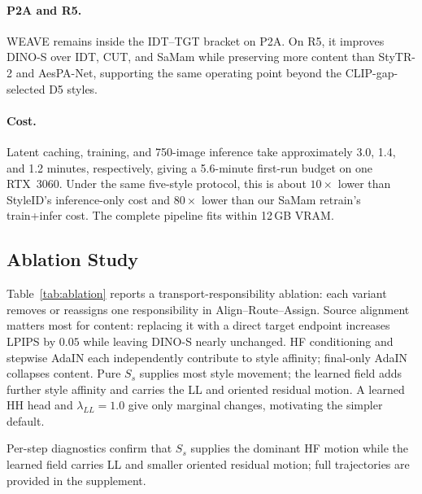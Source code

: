 \documentclass[letterpaper]{article} %
\begin{document}
\paragraph{P2A and R5.}
WEAVE remains inside the IDT--TGT bracket on P2A. On R5, it improves
DINO-S over IDT, CUT, and SaMam while preserving more content than
StyTR-2 and AesPA-Net, supporting the same operating point beyond the
CLIP-gap-selected D5 styles.

\paragraph{Cost.}
Latent caching, training, and 750-image inference take approximately
3.0, 1.4, and 1.2 minutes, respectively, giving a 5.6-minute first-run
budget on one RTX~3060. Under the same five-style protocol, this is
about $10\times$ lower than StyleID's inference-only cost and
$80\times$ lower than our SaMam retrain's train+infer cost. The complete
pipeline fits within 12\,GB VRAM.

\subsection{Ablation Study}
\label{sec:ablation}

Table~\ref{tab:ablation} reports a transport-responsibility ablation: each variant removes
or reassigns one responsibility in Align--Route--Assign. Source alignment matters most for
content: replacing it with a direct target endpoint increases LPIPS by $0.05$ while leaving
DINO-S nearly unchanged. HF conditioning and stepwise AdaIN each independently contribute
to style affinity; final-only AdaIN collapses content. Pure $S_s$ supplies most style movement; the learned field adds
further style affinity and carries the LL and oriented residual motion. A learned HH head and $\lambda_{LL}{=}1.0$ give only
marginal changes, motivating the simpler default.

Per-step diagnostics confirm that $S_s$ supplies the dominant HF motion while the learned field carries LL and smaller oriented residual motion; full trajectories are provided in the supplement.
\end{document}
